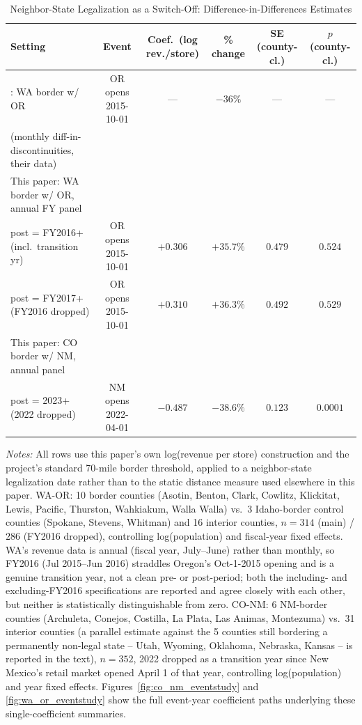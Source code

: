 \begin{table}[htbp]
\centering
\caption{Neighbor-State Legalization as a Switch-Off: Difference-in-Differences Estimates}
\label{tab:switch_eventstudy}
\begin{tabular}{lccccc}
\toprule
Setting & Event & Coef.\ (log rev./store) & \% change & SE (county-cl.) & $p$ (county-cl.) \\
\midrule
\citet{HansenMillerWeber2020}: WA border w/ OR & OR opens 2015-10-01 & --- & $-36\%$ & --- & --- \\
\quad (monthly diff-in-discontinuities, their data) & & & & & \\
\midrule
This paper: WA border w/ OR, annual FY panel & & & & & \\
\quad post = FY2016+ (incl.\ transition yr) & OR opens 2015-10-01 & $+0.306$ & $+35.7\%$ & $0.479$ & $0.524$ \\
\quad post = FY2017+ (FY2016 dropped) & OR opens 2015-10-01 & $+0.310$ & $+36.3\%$ & $0.492$ & $0.529$ \\
\midrule
This paper: CO border w/ NM, annual panel & & & & & \\
\quad post = 2023+ (2022 dropped) & NM opens 2022-04-01 & $-0.487$ & $-38.6\%$ & $0.123$ & $0.0001$ \\
\bottomrule
\end{tabular}
\begin{minipage}{0.95\textwidth}
\vspace{0.3em}
\footnotesize
\textit{Notes:} All rows use this paper's own log(revenue per store) construction and the project's
standard 70-mile border threshold, applied to a neighbor-state legalization date rather than to the
static distance measure used elsewhere in this paper. WA-OR: 10 border counties (Asotin, Benton, Clark,
Cowlitz, Klickitat, Lewis, Pacific, Thurston, Wahkiakum, Walla Walla) vs.\ 3 Idaho-border control counties
(Spokane, Stevens, Whitman) and 16 interior counties, $n=314$ (main) / $286$ (FY2016 dropped), controlling
log(population) and fiscal-year fixed effects. WA's revenue data is annual (fiscal year, July--June) rather
than monthly, so FY2016 (Jul 2015--Jun 2016) straddles Oregon's Oct-1-2015 opening and is a genuine
transition year, not a clean pre- or post-period; both the including- and excluding-FY2016 specifications
are reported and agree closely with each other, but neither is statistically distinguishable from zero.
CO-NM: 6 NM-border counties (Archuleta, Conejos, Costilla, La Plata, Las Animas, Montezuma) vs.\ 31 interior
counties (a parallel estimate against the 5 counties still bordering a permanently non-legal state --
Utah, Wyoming, Oklahoma, Nebraska, Kansas -- is reported in the text), $n=352$, 2022 dropped as a transition
year since New Mexico's retail market opened April 1 of that year, controlling log(population) and
year fixed effects. Figures~\ref{fig:co_nm_eventstudy} and \ref{fig:wa_or_eventstudy} show the full
event-year coefficient paths underlying these single-coefficient summaries.
\end{minipage}
\end{table}
